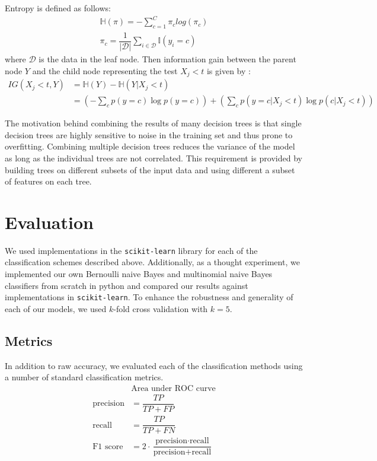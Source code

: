 \documentclass{article} %
\begin{document}
Entropy is defined as follows:
\begin{align*}
\mathbb{H}(\pi) = -\sum_{c=1}^{C}{\pi_c log(\pi_c)}\\
\pi_c = \dfrac{1}{|\mathcal{D}|}\sum_{i \in \mathcal{D}}{\mathbb{I}(y_i = c)}
\end{align*}
where $\mathcal{D}$ is the data in the leaf node. Then information gain between the parent node $Y$ and the child node representing the test $X_j < t$ is given by \cite{textbook}:
\begin{align*}
IG(X_j < t, Y) &= \mathbb{H}(Y) - \mathbb{H}(Y | X_j < t)\\
&=\left(-\sum_c{p(y=c) \log p(y=c)}\right) + \left(\sum_c{p(y=c|X_j < t)\log p(c|X_j < t)}\right)
\end{align*}

The motivation behind combining the results of many decision trees is that single decision trees are highly sensitive to noise in the training set and thus prone to overfitting. Combining multiple decision trees reduces the variance of the model as long as the individual trees are not correlated. This requirement is provided by building trees on different subsets of the input data and using different a subset of features on each tree.

\section{Evaluation}

We used implementations in the \texttt{scikit-learn} \cite{scikitlearn} library for each of the classification schemes described above. Additionally, as a thought experiment, we implemented our own Bernoulli naive Bayes and multinomial naive Bayes classifiers from scratch in python and compared our results against implementations in \texttt{scikit-learn}. To enhance the robustness and generality of each of our models, we used $k$-fold cross validation with $k=5$.

\subsection{Metrics}

In addition to raw accuracy, we evaluated each of the classification methods using a number of standard classification metrics.
\begin{align*}
&\text{Area under ROC curve}\\
\text{precision} &= \dfrac{TP}{TP + FP}\\
\text{recall} &= \dfrac{TP}{TP + FN}\\
\text{F1 score} &= 2 \cdot \dfrac{\text{precision} \cdot \text{recall}}{\text{precision} + \text{recall}}
\end{align*}
\end{document}
